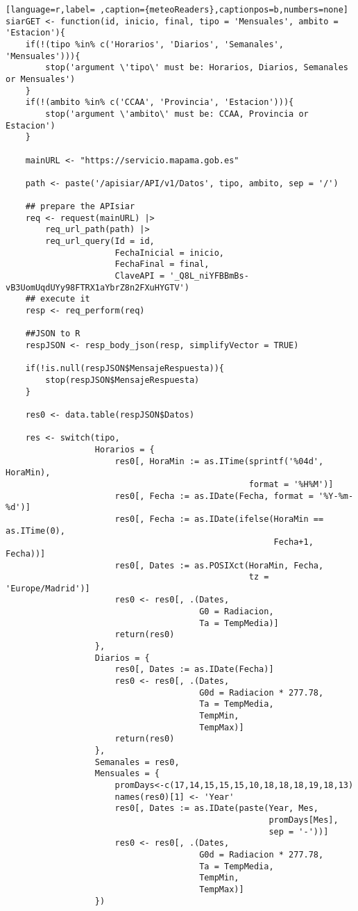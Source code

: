 \begin{lstlisting}[language=r,label= ,caption={meteoReaders},captionpos=b,numbers=none]
siarGET <- function(id, inicio, final, tipo = 'Mensuales', ambito = 'Estacion'){
    if(!(tipo %in% c('Horarios', 'Diarios', 'Semanales', 'Mensuales'))){
        stop('argument \'tipo\' must be: Horarios, Diarios, Semanales or Mensuales')
    }
    if(!(ambito %in% c('CCAA', 'Provincia', 'Estacion'))){
        stop('argument \'ambito\' must be: CCAA, Provincia or Estacion')
    }

    mainURL <- "https://servicio.mapama.gob.es"

    path <- paste('/apisiar/API/v1/Datos', tipo, ambito, sep = '/')

    ## prepare the APIsiar
    req <- request(mainURL) |>
        req_url_path(path) |>
        req_url_query(Id = id,
                      FechaInicial = inicio,
                      FechaFinal = final,
                      ClaveAPI = '_Q8L_niYFBBmBs-vB3UomUqdUYy98FTRX1aYbrZ8n2FXuHYGTV')
    ## execute it
    resp <- req_perform(req)

    ##JSON to R
    respJSON <- resp_body_json(resp, simplifyVector = TRUE)

    if(!is.null(respJSON$MensajeRespuesta)){
        stop(respJSON$MensajeRespuesta)
    }

    res0 <- data.table(respJSON$Datos)

    res <- switch(tipo,
                  Horarios = {
                      res0[, HoraMin := as.ITime(sprintf('%04d', HoraMin),
                                                 format = '%H%M')]
                      res0[, Fecha := as.IDate(Fecha, format = '%Y-%m-%d')]
                      res0[, Fecha := as.IDate(ifelse(HoraMin == as.ITime(0),
                                                      Fecha+1, Fecha))]
                      res0[, Dates := as.POSIXct(HoraMin, Fecha,
                                                 tz = 'Europe/Madrid')]
                      res0 <- res0[, .(Dates,
                                       G0 = Radiacion,
                                       Ta = TempMedia)]
                      return(res0)
                  },
                  Diarios = {
                      res0[, Dates := as.IDate(Fecha)]
                      res0 <- res0[, .(Dates,
                                       G0d = Radiacion * 277.78,
                                       Ta = TempMedia,
                                       TempMin,
                                       TempMax)]
                      return(res0)
                  },
                  Semanales = res0,
                  Mensuales = {
                      promDays<-c(17,14,15,15,15,10,18,18,18,19,18,13)
                      names(res0)[1] <- 'Year'
                      res0[, Dates := as.IDate(paste(Year, Mes,
                                                     promDays[Mes],
                                                     sep = '-'))]
                      res0 <- res0[, .(Dates,
                                       G0d = Radiacion * 277.78,
                                       Ta = TempMedia,
                                       TempMin,
                                       TempMax)]
                  })


\end{lstlisting}
